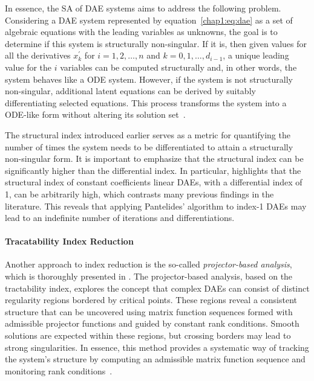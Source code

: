 In essence, the \ac{SA} of \ac{DAE} systems aims to address the following problem. Considering a \ac{DAE} system represented by equation~\eqref{chap1:eq:dae} as a set of algebraic equations with the leading variables as unknowns, the goal is to determine if this system is structurally non-singular. If it is, then given values for all the derivatives $x_k^{\prime}$ for $i = 1, 2, \dots, n$ and $k = 0, 1, \dots, d_{i-1}$, a unique leading value for the $i$ variables can be computed structurally and, in other words, the system behaves like a \ac{ODE} system. However, if the system is not structurally non-singular, additional latent equations can be derived by suitably differentiating selected equations. This process transforms the system into a \ac{ODE}-like form without altering its solution set~\cite{benveniste2021structural}.

The structural index introduced earlier serves as a metric for quantifying the number of times the system needs to be differentiated to attain a structurally non-singular form. It is important to emphasize that the structural index can be significantly higher than the differential index. In particular, \citet{reissig2000differential} highlights that the structural index of constant coefficients linear \acp{DAE}, with a differential index of 1, can be arbitrarily high, which contrasts many previous findings in the literature. This reveals that applying Pantelides' algorithm to index-1 \acp{DAE} may lead to an indefinite number of iterations and differentiations.

\paragraph{Tracatability Index Reduction}

Another approach to index reduction is the so-called \emph{projector-based analysis}, which is thoroughly presented in \citet{lamour2013differential, marz2014differential}. The projector-based analysis, based on the tractability index, explores the concept that complex \acp{DAE} can consist of distinct regularity regions bordered by critical points. These regions reveal a consistent structure that can be uncovered using matrix function sequences formed with admissible projector functions and guided by constant rank conditions. Smooth solutions are expected within these regions, but crossing borders may lead to strong singularities. In essence, this method provides a systematic way of tracking the system's structure by computing an admissible matrix function sequence and monitoring rank conditions~\cite{lamour2011computational}.

